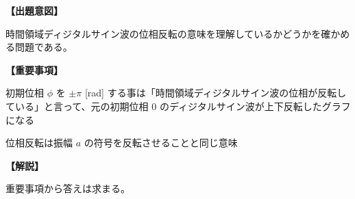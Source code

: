\noindent \textbf{【出題意図】}

\noindent 時間領域ディジタルサイン波の位相反転の意味を理解しているかどうかを確かめる問題である。

\vspace{1em}
\noindent \textbf{【重要事項】}

\bigskip
\noindent  初期位相 $\phi$ を $\pm\pi$ [rad] する事は「時間領域ディジタルサイン波の位相が反転している」と言って、元の初期位相 $0$ のディジタルサイン波が上下反転したグラフになる

\bigskip
\noindent  位相反転は振幅 $a$ の符号を反転させることと同じ意味


\vspace{1em}
\noindent \textbf{【解説】}

\noindent 重要事項から答えは求まる。
